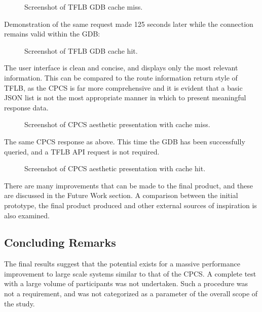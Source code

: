 \documentclass[12pt]{article}   	%
\begin{document}
\noindent
\hfill
\begin{figure}[htp]

\caption{Screenshot of TFLB GDB cache miss.}
\end{figure}
\hfill

\noindent
Demonstration of the same request made 125 seconds later while the connection remains valid within the GDB:

\noindent
\hfill
\begin{figure}[htp]

\caption{Screenshot of TFLB GDB cache hit.}
\end{figure}
\hfill

The user interface is clean and concise, and displays only the most relevant information. This can be compared to the route information return style of TFLB, as the CPCS is far more comprehensive and it is evident that a basic JSON list is not the most appropriate manner in which to present meaningful response data.

\newpage

\begin{figure}[htp]

\hfill
\caption{Screenshot of CPCS aesthetic presentation with cache miss.}
\end{figure}

\newpage

\noindent
The same CPCS response as above. This time the GDB has been successfully queried, and a TFLB API request is not required.

\hfill
\begin{figure}[htp]

\hfill
\caption{Screenshot of CPCS aesthetic presentation with cache hit.}
\end{figure}

\newpage

There are many improvements that can be made to the final product, and these are discussed in the Future Work section. A comparison between the initial prototype, the final product produced and other external sources of inspiration is also examined.

\newpage

\subsection{Concluding Remarks}
The final results suggest that the potential exists for a massive performance improvement to large scale systems similar to that of the CPCS. A complete test with a large volume of participants was not undertaken. Such a procedure was not a requirement, and was not categorized as a parameter of the overall scope of the study.
\end{document}
